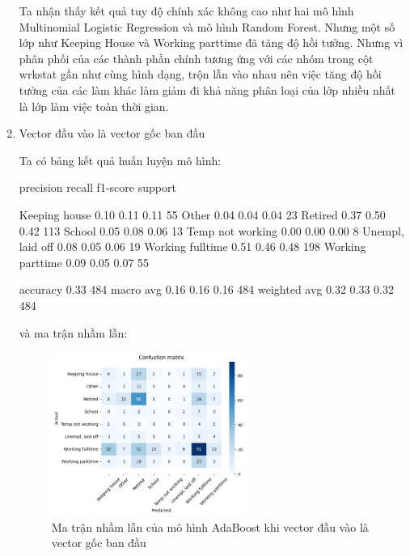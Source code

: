 \begin{enumerate}[label=(\alph*)]
    Ta nhận thấy kết quả tuy độ chính xác không cao như hai mô hình Multinomial Logistic Regression và mô hình Random Forest.
    Nhưng một số lớp như Keeping House và Working parttime đã tăng độ hồi tưởng.
    Nhưng vì phân phối của các thành phần chính tương ứng với các nhóm trong cột wrkstat gần như cùng hình dạng, trộn lẫn vào nhau nên việc tăng độ hồi tưởng của các làm khác làm giảm đi khả năng phân loại của lớp nhiều nhất là lớp làm việc toàn thời gian.
    
    \item Vector đầu vào là vector gốc ban đầu
    
    Ta có bảng kết quả huấn luyện mô hình:

    \begin{python}
                    precision    recall  f1-score   support

   Keeping house       0.10      0.11      0.11        55
           Other       0.04      0.04      0.04        23
         Retired       0.37      0.50      0.42       113
          School       0.05      0.08      0.06        13
Temp not working       0.00      0.00      0.00         8
Unempl, laid off       0.08      0.05      0.06        19
Working fulltime       0.51      0.46      0.48       198
Working parttime       0.09      0.05      0.07        55

        accuracy                           0.33       484
       macro avg       0.16      0.16      0.16       484
    weighted avg       0.32      0.33      0.32       484

    \end{python}

    và ma trận nhầm lẫn:

    \begin{figure}[H]
        \centering
        \includegraphics[width=0.6\textwidth]{figures/Thanh/Models/AdaBoost/With_null_models_confusion_matrix_AdaBoost_original_features.png}
        \caption{Ma trận nhầm lẫn của mô hình AdaBoost khi vector đầu vào là vector gốc ban đầu}
        \label{fig:With_null_models_confusion_matrix_AdaBoost_original_features}
    \end{figure}


\end{enumerate}
